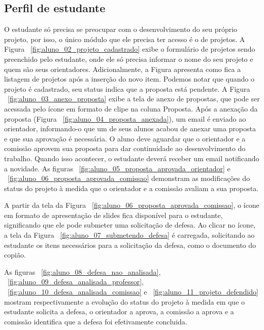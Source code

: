 \subsection{Perfil de estudante}
O estudante só precisa se preocupar com o desenvolvimento do seu próprio projeto, por isso, o único
módulo que ele precisa ter acesso é o de projetos. A Figura ~\ref{fig:aluno_02_projeto_cadastrado} exibe
o formulário de projetos sendo preenchido pelo estudante, onde ele só precisa informar o nome do
seu projeto e quem são seus orientadores. Adicionalmente, a Figura apresenta como fica
a listagem de projetos após a inserção do novo item. Podemos notar que quando o projeto é cadastrado, seu 
status indica que a proposta está pendente. A Figura ~\ref{fig:aluno_03_anexo_proposta} exibe a tela de anexo
de propostas, que pode ser acessada pelo ícone em formato de clipe na coluna Proposta. Após a anexação
da proposta (Figura ~\ref{fig:aluno_04_proposta_anexada}), um email é enviado ao orientador, informando-o
que um de seus alunos acabou de anexar uma proposta e que sua aprovação é necessária. O aluno
deve aguardar que o orientador e a comissão aprovem sua proposta para dar continuidade ao desenvolvimento do
trabalho. Quando isso acontecer, o estudante deverá receber um email notificando a novidade.
As figuras ~\ref{fig:aluno_05_proposta_aprovada_orientador} e ~\ref{fig:aluno_06_proposta_aprovada_comissao}
demonstram as modificações do status do projeto à medida que o orientador e a comissão avaliam 
a sua proposta.

A partir da tela da Figura ~\ref{fig:aluno_06_proposta_aprovada_comissao}, o ícone em formato de apresentação
de slides fica disponível para o estudante, significando que ele pode submeter uma solicitação de defesa. Ao
clicar no ícone, a tela da Figura ~\ref{fig:aluno_07_submetendo_defesa} é carregada, solicitando ao
estudante os itens necessários para a solicitação da defesa, como o documento do copião.

As figuras ~\ref{fig:aluno_08_defesa_nao_analisada}, ~\ref{fig:aluno_09_defesa_analisada_professor}, 
~\ref{fig:aluno_10_defesa_analisada_comissao} e ~\ref{fig:aluno_11_projeto_defendido} mostram 
respectivamente a evolução do status do projeto à medida em que o estudante solicita
a defesa, o orientador a aprova, a comissão a aprova e a comissão identifica que a defesa foi efetivamente concluida.



